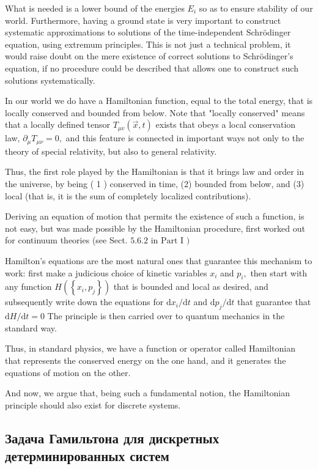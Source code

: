 \documentclass[main.tex]{subfiles}
\begin{document}
What is needed is a lower bound of the energies $E_{i}$ so as to ensure stability of our world. Furthermore, having a ground state is very important to construct systematic approximations to solutions of the time-independent Schrödinger equation, using extremum principles. This is not just a technical problem, it would raise doubt on the mere existence of correct solutions to Schrödinger's equation, if no procedure could be described that allows one to construct such solutions systematically.

In our world we do have a Hamiltonian function, equal to the total energy, that is locally conserved and bounded from below. Note that "locally conserved" means that a locally defined tensor $T_{\mu v}(\vec{x}, t)$ exists that obeys a local conservation law, $\partial_{\mu} T_{\mu \nu}=0,$ and this feature is connected in important ways not only to the theory of special relativity, but also to general relativity.

Thus, the first role played by the Hamiltonian is that it brings law and order in the universe, by being ( 1 ) conserved in time, (2) bounded from below, and (3) local (that is, it is the sum of completely localized contributions).

Deriving an equation of motion that permits the existence of such a function, is not easy, but was made possible by the Hamiltonian procedure, first worked out for continuum theories (see Sect. $5.6 .2 \text { in Part I })$

Hamilton's equations are the most natural ones that guarantee this mechanism to work: first make a judicious choice of kinetic variables $x_{i}$ and $p_{i},$ then start with any function $H\left(\left\{x_{i}, p_{j}\right\}\right)$ that is bounded and local as desired, and subsequently write down the equations for $\mathrm{d} x_{i} / \mathrm{d} t$ and $\mathrm{d} p_{j} / \mathrm{d} t$ that guarantee that $\mathrm{d} H / \mathrm{d} t=0$ The principle is then carried over to quantum mechanics in the standard way.

Thus, in standard physics, we have a function or operator called Hamiltonian that represents the conserved energy on the one hand, and it generates the equations of motion on the other.

And now, we argue that, being such a fundamental notion, the Hamiltonian principle should also exist for discrete systems.


\subsection{Задача Гамильтона для дискретных детерминированных систем}\label{ch19.2}
\end{document}
